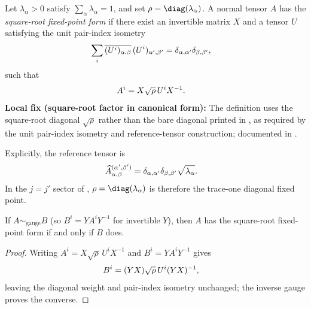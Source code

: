 \begin{definition}%
    \label{def:is_isometry_canonical_form}
    \leanok
    Let $\lambda_\alpha>0$ satisfy $\sum_\alpha\lambda_\alpha=1$, and set
    $\rho=\diag(\lambda_\alpha)$. A normal tensor $A$ has the
    \emph{square-root fixed-point form} if there exist an invertible matrix
    $X$ and a tensor $U$ satisfying the unit pair-index isometry
    \begin{align}
        \sum_i \overline{(U^i)_{\alpha,\beta}}\,(U^i)_{\alpha',\beta'}
         & = \delta_{\alpha,\alpha'}\delta_{\beta,\beta'},
        \notag
    \end{align}
    such that
    \begin{align}
        A^i & =X\sqrt{\rho}\,U^iX^{-1}.
        \notag
    \end{align}
    \textbf{Local fix (square-root factor in canonical form):}
    The definition uses the square-root diagonal $\sqrt{\rho}$ rather than the
    bare diagonal printed in \cite[line~1278]{Cirac2016MPDO_arXiv}, as required
    by the unit pair-index isometry and reference-tensor construction; documented
    in \cite{gap:cpsv16_rfp_isometry_scope}.

    Explicitly, the reference tensor is
    \begin{align}
        \widehat A^{(\alpha',\beta')}_{\alpha,\beta}
         & = \delta_{\alpha,\alpha'}\delta_{\beta,\beta'}
        \sqrt{\lambda_\alpha}.
        \notag
    \end{align}
    In the $j=j'$ sector of
    \cite[Appendix~B, lines~1278, 1281--1283, 1300]{Cirac2016MPDO_arXiv},
    $\rho=\diag(\lambda_\alpha)$ is therefore the trace-one diagonal fixed
    point.
\end{definition}

\begin{lemma}%
    \label{lem:isometry_canonical_form_gauge_invariant}
    \leanok
    If $A \sim_{\mathrm{gauge}} B$ (so $B^i = Y A^i Y^{-1}$ for invertible $Y$), then $A$ has the square-root fixed-point form if and only if $B$ does.
\end{lemma}
\begin{proof}\leanok
    Writing $A^i=X\sqrt\rho\,U^iX^{-1}$ and
    $B^i=Y A^iY^{-1}$ gives
    \begin{align}
        B^i & =(YX)\sqrt\rho\,U^i(YX)^{-1},
        \notag
    \end{align}
    leaving the diagonal weight and pair-index isometry unchanged; the inverse
    gauge proves the converse.
\end{proof}

